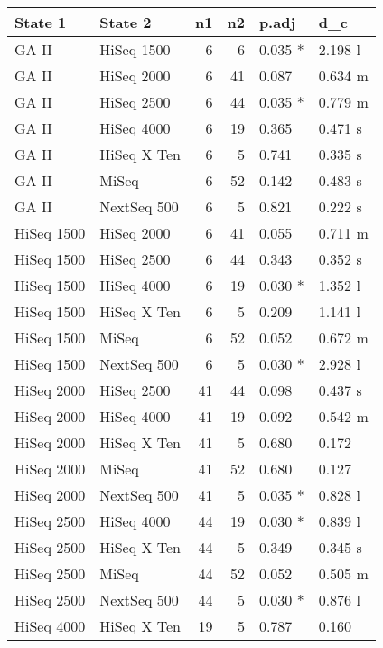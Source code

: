 \begin{table}[ht]
\centering
\begin{tabular}{llrrll}
  \hline
State 1 & State 2 & n1 & n2 & p.adj & d\_c \\ 
  \hline
GA II & HiSeq 1500 &    6 &    6 & 0.035 * & 2.198 l \\ 
  GA II & HiSeq 2000 &    6 &   41 & 0.087 & 0.634 m \\ 
  GA II & HiSeq 2500 &    6 &   44 & 0.035 * & 0.779 m \\ 
  GA II & HiSeq 4000 &    6 &   19 & 0.365 & 0.471 s \\ 
  GA II & HiSeq X Ten &    6 &    5 & 0.741 & 0.335 s \\ 
  GA II & MiSeq &    6 &   52 & 0.142 & 0.483 s \\ 
  GA II & NextSeq 500 &    6 &    5 & 0.821 & 0.222 s \\ 
  HiSeq 1500 & HiSeq 2000 &    6 &   41 & 0.055 & 0.711 m \\ 
  HiSeq 1500 & HiSeq 2500 &    6 &   44 & 0.343 & 0.352 s \\ 
  HiSeq 1500 & HiSeq 4000 &    6 &   19 & 0.030 * & 1.352 l \\ 
  HiSeq 1500 & HiSeq X Ten &    6 &    5 & 0.209 & 1.141 l \\ 
  HiSeq 1500 & MiSeq &    6 &   52 & 0.052 & 0.672 m \\ 
  HiSeq 1500 & NextSeq 500 &    6 &    5 & 0.030 * & 2.928 l \\ 
  HiSeq 2000 & HiSeq 2500 &   41 &   44 & 0.098 & 0.437 s \\ 
  HiSeq 2000 & HiSeq 4000 &   41 &   19 & 0.092 & 0.542 m \\ 
  HiSeq 2000 & HiSeq X Ten &   41 &    5 & 0.680 & 0.172 \\ 
  HiSeq 2000 & MiSeq &   41 &   52 & 0.680 & 0.127 \\ 
  HiSeq 2000 & NextSeq 500 &   41 &    5 & 0.035 * & 0.828 l \\ 
  HiSeq 2500 & HiSeq 4000 &   44 &   19 & 0.030 * & 0.839 l \\ 
  HiSeq 2500 & HiSeq X Ten &   44 &    5 & 0.349 & 0.345 s \\ 
  HiSeq 2500 & MiSeq &   44 &   52 & 0.052 & 0.505 m \\ 
  HiSeq 2500 & NextSeq 500 &   44 &    5 & 0.030 * & 0.876 l \\ 
  HiSeq 4000 & HiSeq X Ten &   19 &    5 & 0.787 & 0.160 \\ 

\end{tabular}
\end{table}
